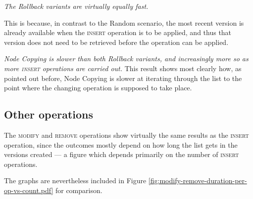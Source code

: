 \textit{The Rollback variants are virtually equally fast.}

This is because, in contrast to the Random scenario, the most recent version is
already available when the \textsc{insert} operation is to be applied, and thus
that version does not need to be retrieved before the operation can be applied.

\textit{Node Copying is slower than both Rollback variants, and increasingly
more so as more \textsc{insert} operations are carried out.} This result shows
most clearly how, as pointed out before, Node Copying is slower at iterating
through the list to the point where the changing operation is supposed to take
place.

\subsection{Other operations}
The \textsc{modify} and \textsc{remove} operations show virtually the same
results as the \textsc{insert} operation, since the outcomes mostly depend on
how long the list gets in the versions created --- a figure which depends
primarily on the number of \textsc{insert} operations.

The graphs are nevertheless included in Figure
\ref{fig:modify-remove-duration-per-op-vs-count.pdf} for comparison.

